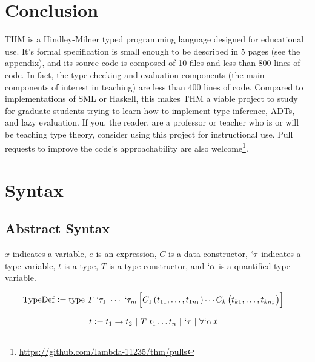 \documentclass[12pt]{article}
\begin{document}
\section{Conclusion}

THM is a Hindley-Milner typed programming language designed for
educational use.
It's formal specification is small enough to be described in 5 pages
(see the appendix), and its source code is composed of 10 files and
less than 800 lines of code.
In fact, the type checking and evaluation components (the main
components of interest in teaching) are less than 400 lines of code.
Compared to implementations of SML or Haskell, this makes THM a viable
project to study for graduate students trying to learn how to
implement type inference, ADTs, and lazy evaluation.
If you, the reader, are a professor or teacher who is or will be
teaching type theory, consider using this project for instructional
use.
Pull requests to improve the code's approachability are also
welcome\footnote{\url{https://github.com/lambda-11235/thm/pulls}}.


\printbibliography


\pagebreak


\appendix

\section{Syntax}
\label{app:syntax}

\subsection{Abstract Syntax}

$x$ indicates a variable, $e$ is an expression, $C$ is a data
constructor, $`\tau$ indicates a type variable, $t$ is a type, $T$ is a
type constructor, and $`\alpha$ is a quantified type variable.

\begin{align}
  \mathrm{TypeDef} &:= \mathrm{type}~T~`\tau_1~\cdots~`\tau_m \sbr{
                     C_1\del{t_{11},\ldots,t_{1n_1}} 
                     \cdots
                     C_k\del{t_{k1},\ldots,t_{kn_k}}
                     } \label{eq:typedef}
\end{align}

\begin{align}
  t &:= t_1 \to t_2 ~|~ T~t_1 \ldots t_n ~|~ `\tau ~|~ \forall `\alpha. t
\end{align}
\end{document}
